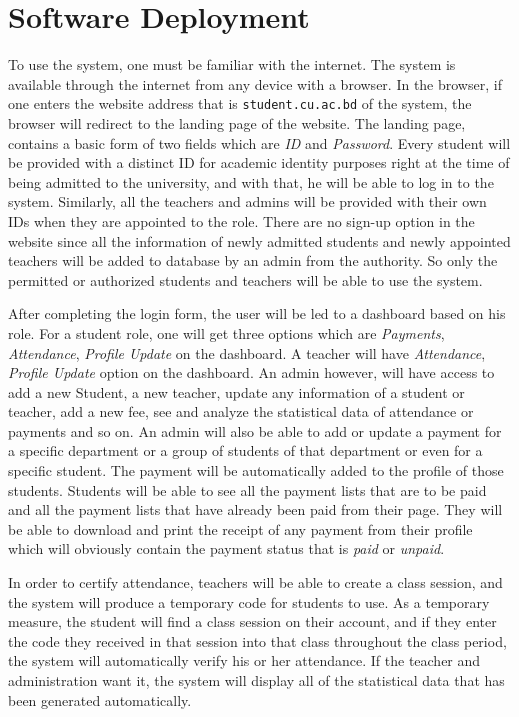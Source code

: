 \section{Software Deployment}\label{sec:sd}

To use the system, one must be familiar with the internet. The system is available through the internet from any device with a browser. In the browser, if one enters the website address that is \texttt{student.cu.ac.bd} of the system, the browser will redirect to the landing page of the website. The landing page, contains a basic form of two fields which are \textit{ID} and \textit{Password}. Every student will be provided with a distinct ID for academic identity purposes right at the time of being admitted to the university, and with that, he will be able to log in to the system. Similarly, all the teachers and admins will be provided with their own IDs when they are appointed to the role. There are no sign-up option in the website since all the information of newly admitted students and newly appointed teachers will be added to database by an admin from the authority. So only the permitted or authorized students and teachers will be able to use the system.

After completing the login form, the user will be led to a dashboard based on his role. For a student role, one will get three options which are \textit{Payments}, \textit{Attendance}, \textit{Profile Update} on the dashboard. A teacher will have \textit{Attendance}, \textit{Profile Update} option on the dashboard. An admin however, will have access to add a new Student, a new teacher, update any information of a student or teacher, add a new fee, see and analyze the statistical data of attendance or payments and so on. An admin will also be able to add or update a payment for a specific department or a group of students of that department or even for a specific student. The payment will be automatically added to the profile of those students. Students will be able to see all the payment lists that are to be paid and all the payment lists that have already been paid from their page. They will be able to download and print the receipt of any payment from their profile which will obviously contain the payment status that is \textit{paid} or \textit{unpaid}.

In order to certify attendance, teachers will be able to create a class session, and the system will produce a temporary code for students to use. As a temporary measure, the student will find a class session on their account, and if they enter the code they received in that session into that class throughout the class period, the system will automatically verify his or her attendance. If the teacher and administration want it, the system will display all of the statistical data that has been generated automatically.

